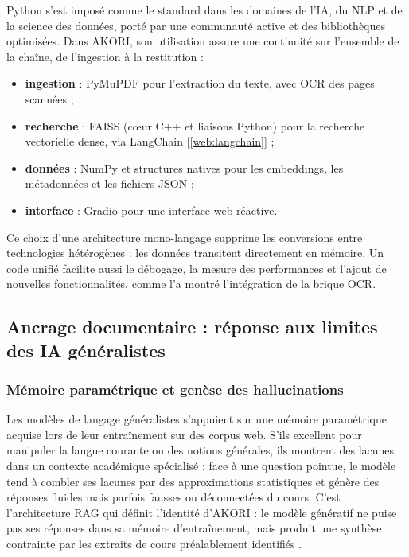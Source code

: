 \documentclass[12pt,a4paper,oneside]{report}
\newcommand{\webref}[1]{[\ref{web:#1}]}
\begin{document}
Python s'est imposé comme le standard dans les domaines de l'IA, du NLP et de la science des données, porté par une communauté active et des bibliothèques optimisées. Dans AKORI, son utilisation assure une continuité sur l'ensemble de la chaîne, de l'ingestion à la restitution :
\begin{itemize}[nosep]
  \item \textbf{ingestion} : PyMuPDF pour l'extraction du texte, avec OCR des pages scannées ;
  \item \textbf{recherche} : FAISS (cœur C++ et liaisons Python) pour la recherche vectorielle dense, via LangChain \webref{langchain} ;
  \item \textbf{données} : NumPy et structures natives pour les embeddings, les métadonnées et les fichiers JSON ;
  \item \textbf{interface} : Gradio \cite{abid2019gradio} pour une interface web réactive.
\end{itemize}

Ce choix d'une architecture mono-langage supprime les conversions entre technologies hétérogènes : les données transitent directement en mémoire. Un code unifié facilite aussi le débogage, la mesure des performances et l'ajout de nouvelles fonctionnalités, comme l'a montré l'intégration de la brique OCR.

\subsection{Ancrage documentaire : réponse aux limites des IA généralistes}

\subsubsection*{Mémoire paramétrique et genèse des hallucinations}

Les modèles de langage généralistes s'appuient sur une mémoire paramétrique acquise lors de leur entraînement sur des corpus web. S'ils excellent pour manipuler la langue courante ou des notions générales, ils montrent des lacunes dans un contexte académique spécialisé : face à une question pointue, le modèle tend à combler ses lacunes par des approximations statistiques et génère des réponses fluides mais parfois fausses ou déconnectées du cours. C'est l'architecture RAG qui définit l'identité d'AKORI : le modèle génératif ne puise pas ses réponses dans sa mémoire d'entraînement, mais produit une synthèse contrainte par les extraits de cours préalablement identifiés \cite{lewis2020rag}.
\end{document}
